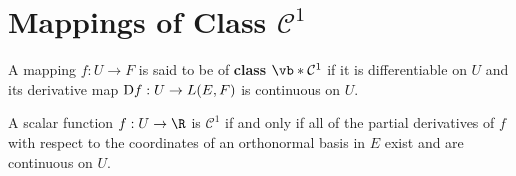\section{Mappings of Class \( \mathcal{C}^1\)}
\label{sec:C1}
\begin{definition}
  A mapping \( f:U\to F \) is said to be of \textbf{class \(\vb*{\mathcal{C}^1}\)} if it is differentiable on \( U \) and its derivative map \( \text{D} f:U\to L(E,F) \) is continuous on \( U \).
\end{definition}

\begin{theorem}
  \label{thm:scalar-C1}
  A scalar function \( f:U\to \R \) is \( \mathcal{C}^1 \) if and only if all of the partial derivatives of \( f \) with respect to the coordinates of an orthonormal basis in \( E \) exist and are continuous on \( U \).
\end{theorem}
